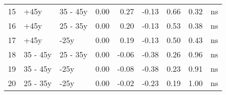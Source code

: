 \documentclass[]{report}
\begin{document}
\begin{table}[ht]
{\begin{tabular}{rllrrrrrl}
	15 & +45y & 35 - 45y & 0.00 & 0.27 & -0.13 & 0.66 & 0.32 & ns \\ 
	16 & +45y & 25 - 35y & 0.00 & 0.20 & -0.13 & 0.53 & 0.38 & ns \\ 
	17 & +45y & -25y & 0.00 & 0.19 & -0.13 & 0.50 & 0.43 & ns \\ 
	18 & 35 - 45y & 25 - 35y & 0.00 & -0.06 & -0.38 & 0.26 & 0.96 & ns \\ 
	19 & 35 - 45y & -25y & 0.00 & -0.08 & -0.38 & 0.23 & 0.91 & ns \\ 
	20 & 25 - 35y & -25y & 0.00 & -0.02 & -0.23 & 0.19 & 1.00 & ns \\ 
	\hline
\end{tabular}
}
\end{table}

\end{document}
